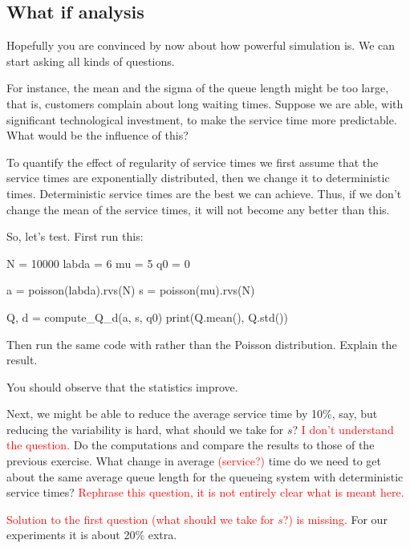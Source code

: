 \documentclass{scrartcl}
\newcommand{\notet}[1]{\textcolor{red}{#1}}
\begin{document}
\subsection{What if analysis}
\label{sec:what-if-analysis}

Hopefully you  are  convinced by now about how powerful simulation is.  We can start asking all kinds of questions.

\begin{exercise}
  For instance,  the mean and the sigma of the queue length might be too large, that is, customers complain about long waiting times.  Suppose we are able, with significant technological investment, to make the service time more predictable. What would be the influence of this?

To quantify the effect of regularity of service times we first assume that the service times are exponentially distributed, then we change it to deterministic times.
 Deterministic service times are the best we can achieve. Thus, if we don't change the mean of the service times, it will not become any better than this.


So, let's test. First run this:
\begin{pyverbatim}
N = 10000
labda = 6
mu = 5
q0 = 0

a = poisson(labda).rvs(N)
s = poisson(mu).rvs(N)

Q, d = compute_Q_d(a, s, q0)
print(Q.mean(), Q.std())
\end{pyverbatim}
Then run the same code with  rather than the Poisson distribution. Explain the result.
\begin{solution}
	You should observe that the statistics improve.
\end{solution}
\end{exercise}



\begin{exercise}
  Next, we might be able to reduce the average service time by 10\%, say, but reducing the variability is hard, what should we take for $s$? \notet{I don't understand the question.} Do the computations and compare the results to those of the previous exercise. What change in average \notet{(service?)} time do we need to get about the same average queue length for the queueing system with deterministic service times? \notet{Rephrase this question, it is not entirely clear what is meant here.}
  \begin{solution}
\notet{Solution to the first question (what should we take for $s$?) is missing.} For our experiments it is about 20\% extra.
  \end{solution}
\end{exercise}
\end{document}
